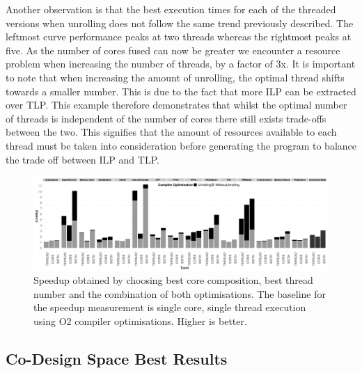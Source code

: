 Another observation is that the best execution times for each of the threaded versions when unrolling does not follow the same trend previously described.
The leftmost curve performance peaks at two threads whereas the rightmost peaks at five.
As the number of cores fused can now be greater we encounter a resource problem when increasing the number of threads, by a factor of 3x.
It is important to note that when increasing the amount of unrolling, the optimal thread shifts towards a smaller number.
This is due to the fact that more ILP can be extracted over TLP.
This example therefore demonstrates that whilst the optimal number of threads is independent of the number of cores there still exists trade-offs between the two.
This signifies that the amount of resources available to each thread must be taken into consideration before generating the program to balance the trade off between ILP and TLP.

\begin{figure}
 \centering
  \centering
    \includegraphics[width=1\textwidth]{streamit-paper/graphics/threadcompbench.pdf}
    \caption{Speedup obtained by choosing best core composition, best
      thread number and the combination of both optimisations. The baseline for the speedup measurement is single core, single thread execution using O2 compiler optimisations. Higher
      is better.}\label{fig:overviewhist}
\end{figure}

\subsection{Co-Design Space Best Results}

